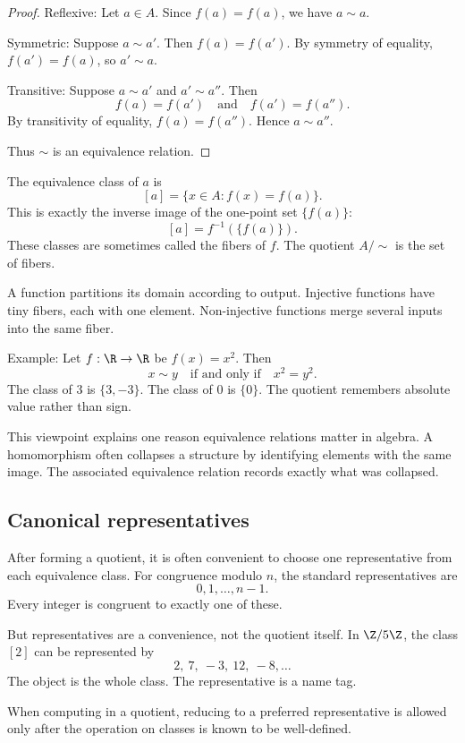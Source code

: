 \begin{proof}
Reflexive: Let $a\in A$. Since $f(a)=f(a)$, we have $a\sim a$.

Symmetric: Suppose $a\sim a'$. Then $f(a)=f(a')$. By symmetry of equality, $f(a')=f(a)$, so $a'\sim a$.

Transitive: Suppose $a\sim a'$ and $a'\sim a''$. Then
\[
f(a)=f(a')\quad\text{and}\quad f(a')=f(a'').
\]
By transitivity of equality, $f(a)=f(a'')$. Hence $a\sim a''$.

Thus $\sim$ is an equivalence relation.
\end{proof}

The equivalence class of $a$ is
\[
[a]=\{x\in A:f(x)=f(a)\}.
\]
This is exactly the inverse image of the one-point set $\{f(a)\}$:
\[
[a]=f^{-1}(\{f(a)\}).
\]
These classes are sometimes called the fibers of $f$. The quotient $A/{\sim}$ is the set of fibers.

\begin{intuitionbox}
A function partitions its domain according to output. Injective functions have tiny fibers, each with one element. Non-injective functions merge several inputs into the same fiber.
\end{intuitionbox}

Example: Let $f:\R\to\R$ be $f(x)=x^2$. Then
\[
x\sim y\quad\text{if and only if}\quad x^2=y^2.
\]
The class of $3$ is $\{3,-3\}$. The class of $0$ is $\{0\}$. The quotient remembers absolute value rather than sign.

This viewpoint explains one reason equivalence relations matter in algebra. A homomorphism often collapses a structure by identifying elements with the same image. The associated equivalence relation records exactly what was collapsed.

\subsection{Canonical representatives}

After forming a quotient, it is often convenient to choose one representative from each equivalence class. For congruence modulo $n$, the standard representatives are
\[
0,1,\ldots,n-1.
\]
Every integer is congruent to exactly one of these.

But representatives are a convenience, not the quotient itself. In $\Z/5\Z$, the class $[2]$ can be represented by
\[
2,\ 7,\ -3,\ 12,\ -8,\ldots
\]
The object is the whole class. The representative is a name tag.

\begin{trapbox}
When computing in a quotient, reducing to a preferred representative is allowed only after the operation on classes is known to be well-defined.
\end{trapbox}

